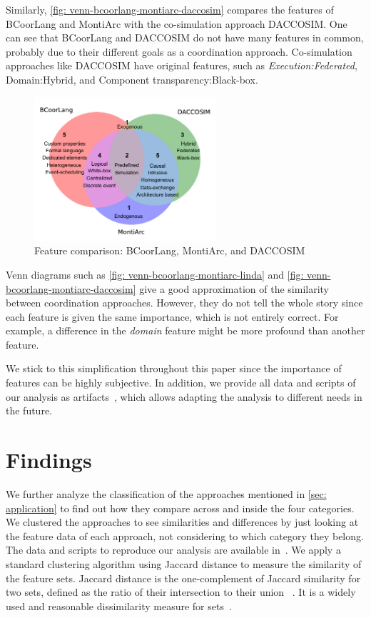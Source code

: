 \documentclass[runningheads]{llncs}
\begin{document}
Similarly, \autoref{fig: venn-bcoorlang-montiarc-daccosim} compares the features of BCoorLang and MontiArc with the co-simulation approach DACCOSIM.
One can see that BCoorLang and DACCOSIM do not have many features in common, probably due to their different goals as a coordination approach.
Co-simulation approaches like DACCOSIM have original features, such as \textit{Execution:Federated}, \textsf{Domain:Hybrid}, and \textsf{Component transparency:Black-box}.

\begin{figure}[ht]
	\centering
	\includegraphics[width=0.6\textwidth]{images/venn_bcoorlang_montiarc_daccosim}
	\caption{Feature comparison: BCoorLang, MontiArc, and DACCOSIM}
	\label{fig: venn-bcoorlang-montiarc-daccosim}
\end{figure}

Venn diagrams such as \autoref{fig: venn-bcoorlang-montiarc-linda} and \autoref{fig: venn-bcoorlang-montiarc-daccosim} give a good approximation of the similarity between coordination approaches.
However, they do not tell the whole story since each feature is given the same importance, which is not entirely correct.
For example, a difference in the \textit{domain} feature might be more profound than another feature.

We stick to this simplification throughout this paper since the importance of features can be highly subjective.
In addition, we provide all data and scripts of our analysis as artifacts~\cite{timkrauterArtifactsCoordination2024}, which allows adapting the analysis to different needs in the future.

\section{Findings} \label{sec: findings}

We further analyze the classification of the approaches mentioned in \autoref{sec: application} to find out how they compare across and inside the four categories.
We clustered the approaches to see similarities and differences by just looking at the feature data of each approach, not considering to which category they belong.
The data and scripts to reproduce our analysis are available in~\cite{timkrauterArtifactsCoordination2024}.
We apply a standard clustering algorithm using Jaccard distance to measure the similarity of the feature sets.
Jaccard distance is the one-complement of Jaccard similarity for two sets, defined as the ratio of their intersection to their union ~\cite{levandowskyDistanceSets1971}.
It is a widely used and reasonable dissimilarity measure for sets~\cite{levandowskyDistanceSets1971}.
\end{document}
